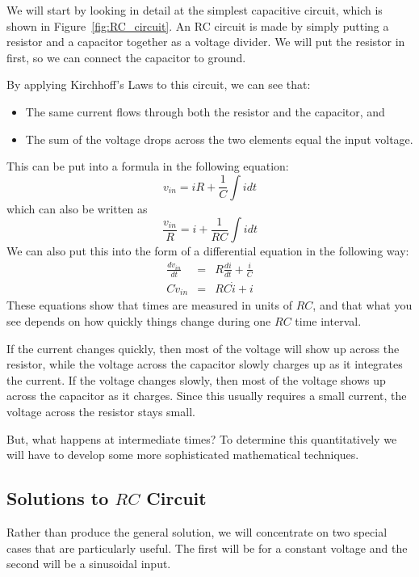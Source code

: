 \documentclass{article}
\begin{document}
We will start by looking in detail at the simplest capacitive circuit, which is shown in Figure~\ref{fig:RC_circuit}. An RC circuit is made by simply putting a resistor and a capacitor together as a voltage divider. We will put the resistor in first, so we can connect the capacitor to ground.

By applying Kirchhoff's Laws to this circuit, we can see that:
\begin{itemize}
\item The same current flows through both the resistor and the capacitor, and
\item The sum of the voltage drops across the two elements equal the input voltage.
\end{itemize}
This can be put into a formula in the following equation:
\begin{equation}
v_{in} = i R + \frac{1}{C} \int i dt
\end{equation}
which can also be written as
\begin{equation}
\frac{v_{in}}{R} = i + \frac{1}{RC} \int i dt
\end{equation}
We can also put this into the form of a differential equation in the following way:
\begin{eqnarray}
\frac{dv_{in}}{dt} & = & R \frac{di}{dt} + \frac{i}{C}  \nonumber \\
C \dot{v}_{in} & = & R C \dot{i} + i
\label{eqn:RC_diffeqn}
\end{eqnarray}
These equations show that times are measured in units of $RC$, and that what you see depends on how quickly things change during one $RC$ time interval.

If the current changes quickly, then most of the voltage will show up across the resistor, while the voltage across the capacitor slowly charges up as it integrates the current. If the voltage changes slowly, then most of the voltage shows up across the capacitor as it charges. Since this usually requires a small current, the voltage across the resistor stays small.

But, what happens at intermediate times? To determine this quantitatively we will have to develop some more sophisticated mathematical techniques.

\subsection{Solutions to $RC$ Circuit}
Rather than produce the general solution, we will concentrate on two special cases that are particularly useful. The first will be for a constant voltage and the second will be a sinusoidal input.
\end{document}
